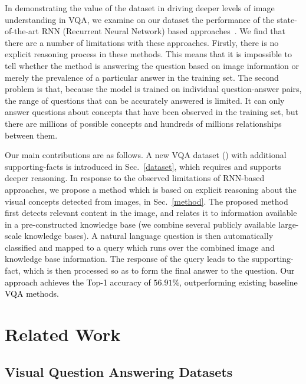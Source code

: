 \documentclass[10pt,journal]{IEEEtran}
\def\bluettt{\textcolor{black}}
\begin{document}
In demonstrating the value of the dataset in driving deeper levels of image understanding in VQA, we
examine on our \KBName dataset 
the performance of the state-of-the-art RNN (Recurrent Neural Network) based approaches~\cite{antol2015vqa,malinowski2014towards,ren2015image}.  We find that there are a number of limitations with these approaches. Firstly, there is no explicit reasoning process in these methods. This means that it is impossible to tell whether the method is answering the question based on image information or merely the prevalence of a particular answer in the training set. The second problem is that, because the model is trained on individual question-answer pairs, the range of questions that can be accurately answered is limited. It can only answer questions about concepts that have been observed in the training set, but there are millions of possible concepts and hundreds of millions relationships between them. 

Our main contributions are as follows.
A new VQA dataset (\KBName) with additional supporting-facts is introduced in Sec.~\ref{dataset}, which requires and supports deeper reasoning.
In response to the observed limitations of RNN-based approaches, we propose a method which is based on explicit reasoning about the visual concepts detected from images, in Sec.~\ref{method}. The proposed method first detects relevant content in the image, and relates it to information available in a pre-constructed knowledge base (we combine several publicly available large-scale knowledge bases). A natural language question is then automatically classified and mapped to a query which runs over the combined image and knowledge base information. The response of the query leads to the supporting-fact, which is then processed so as to form the final answer to the question. 
\bluettt{Our approach achieves the Top-1 accuracy of $56.91\%$, outperforming existing baseline VQA methods.}









\section{Related Work}
\label{relwork}

\subsection{Visual Question Answering Datasets}
\end{document}
